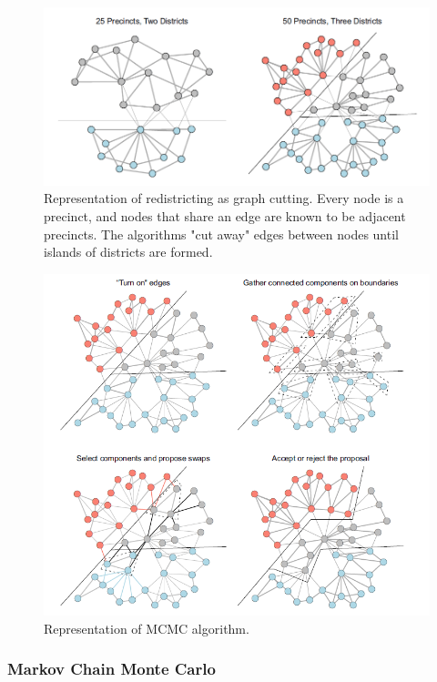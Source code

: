 \begin{figure}
    \centering
    \includegraphics[width=\linewidth]{img/graphcut.png}
    \caption{Representation of redistricting as graph cutting. Every node is a precinct, and nodes that share an edge are known to be adjacent precincts. The algorithms "cut away" edges between nodes until islands of districts are formed. \parencite
    [3]{fifield2020}}
    \label{fig:graphcut}
\end{figure}

\begin{figure}
    \centering
    \includegraphics[width=0.75\linewidth]{img/swaps.png}
    \caption{Representation of MCMC algorithm. \parencite[4]{fifield2020}}
    \label{fig:swaps}
\end{figure}

\subsubsection{Markov Chain Monte Carlo}
\label{sec:mcmc}

